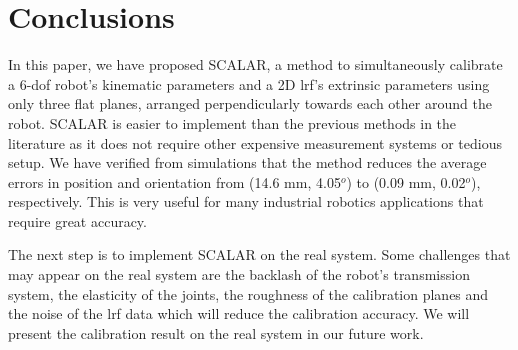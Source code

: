 \section{Conclusions}
\label{sec:conclusions}

In this paper, we have proposed SCALAR, a method to simultaneously calibrate a 6-\ac{dof} robot's kinematic parameters and a 2D \ac{lrf}'s extrinsic parameters using only three flat planes, arranged perpendicularly towards each other around the robot. SCALAR is easier to implement than the previous methods in the literature as it does not require other expensive measurement systems or tedious setup. We have verified from simulations that the method reduces the average errors in position and orientation from (14.6 mm, 4.05$^o$) to (0.09 mm, 0.02$^o$), respectively. This is very useful for many industrial robotics applications that require great accuracy. 

The next step is to implement SCALAR on the real system. Some challenges that may appear on the real system are the backlash of the robot's transmission system, the elasticity of the joints, the roughness of the calibration planes and the noise of the \ac{lrf} data which will reduce the calibration accuracy. We will present the calibration result on the real system in our future work. 
